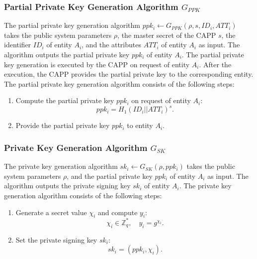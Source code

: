 \subsubsection{Partial Private Key Generation Algorithm $G_{PPK}$}
The partial private key generation algorithm $ppk_i \leftarrow G_{PPK}(\rho, s, ID_i, ATT_i)$ takes the public system parameters $\rho$, the master secret of the CAPP $s$, the identifier $ID_i$ of entity $A_i$, and the attributes $ATT_i$ of entity $A_i$ as input.
The algorithm outputs the partial private key $ppk_i$ of entity $A_i$.
The partial private key generation is executed by the CAPP on request of entity $A_i$.
After the execution, the CAPP provides the partial private key to the corresponding entity.
The partial private key generation algorithm consists of the following steps:
\begin{enumerate}
    \item Compute the partial private key $ppk_i$ on request of entity $A_i$:
    \[
        ppk_i = H_1(ID_i || ATT_i)^{s}.
    \]
    \item Provide the partial private key $ppk_i$ to entity $A_i$.
\end{enumerate}

\subsubsection{Private Key Generation Algorithm $G_{SK}$}
The private key generation algorithm $sk_i \leftarrow G_{SK}(\rho, ppk_i)$ takes the public system parameters $\rho$, and the partial private key $ppk_i$ of entity $A_i$ as input.
The algorithm outputs the private signing key $sk_i$ of entity $A_i$.
The private key generation algorithm consists of the following steps:
\begin{enumerate}
    \item Generate a secret value $\chi_i$ and compute $y_i$:
    \[
        \chi_i \in \mathbb{Z}_q^*, \quad y_i = g^{\chi_i}.
    \]
    \item Set the private signing key $sk_i$:
    \[
        sk_i = (ppk_i, \chi_i).
    \]
\end{enumerate}


